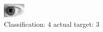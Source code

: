 \begin{figure}[h!]
\begin{center}
\includegraphics[width=0.60\columnwidth]{figures/ID300_class_4_target_3.png}
\end{center}
\caption{ Classification: 4 actual target: 3}
\label{fig:ID300_class_4_target_3}
\end{figure}
